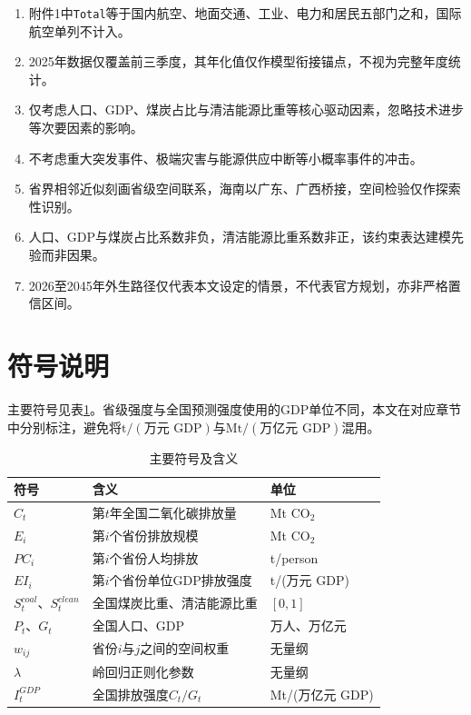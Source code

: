 \documentclass[12pt,a4paper]{ctexart}
\theoremstyle{definition}
\theoremstyle{plain}
\theoremstyle{remark}
\begin{document}
\begin{enumerate}[label=(\arabic*)]
\item 附件1中\texttt{Total}等于国内航空、地面交通、工业、电力和居民五部门之和，国际航空单列不计入。
\item 2025年数据仅覆盖前三季度，其年化值仅作模型衔接锚点，不视为完整年度统计。
\item 仅考虑人口、GDP、煤炭占比与清洁能源比重等核心驱动因素，忽略技术进步等次要因素的影响。
\item 不考虑重大突发事件、极端灾害与能源供应中断等小概率事件的冲击。
\item 省界相邻近似刻画省级空间联系，海南以广东、广西桥接，空间检验仅作探索性识别。
\item 人口、GDP与煤炭占比系数非负，清洁能源比重系数非正，该约束表达建模先验而非因果。
\item 2026至2045年外生路径仅代表本文设定的情景，不代表官方规划，亦非严格置信区间。
\end{enumerate}

\section{符号说明}
主要符号见表\ref{tab:symbol}。省级强度与全国预测强度使用的GDP单位不同，本文在对应章节中分别标注，避免将$\mathrm{t}/(\text{万元 GDP})$与$\mathrm{Mt}/(\text{万亿元 GDP})$混用。

\begin{table}[H]
\centering
\caption{主要符号及含义}
\label{tab:symbol}
\begin{tabular}{>{\centering\arraybackslash}p{2.7cm}>{\raggedright\arraybackslash}p{7.2cm}>{\centering\arraybackslash}p{2.0cm}}
\toprule
符号 & 含义 & 单位\\
\midrule
$C_t$ & 第$t$年全国二氧化碳排放量 & Mt CO$_2$\\
$E_i$ & 第$i$个省份排放规模 & Mt CO$_2$\\
$PC_i$ & 第$i$个省份人均排放 & t/person\\
$EI_i$ & 第$i$个省份单位GDP排放强度 & t/(万元 GDP)\\
$S_t^{coal}$、$S_t^{clean}$ & 全国煤炭比重、清洁能源比重 & $[0,1]$\\
$P_t$、$G_t$ & 全国人口、GDP & 万人、万亿元\\
$w_{ij}$ & 省份$i$与$j$之间的空间权重 & 无量纲\\
$\lambda$ & 岭回归正则化参数 & 无量纲\\
$I_t^{GDP}$ & 全国排放强度$C_t/G_t$ & Mt/(万亿元 GDP)\\
\bottomrule
\end{tabular}
\end{table}
\end{document}
